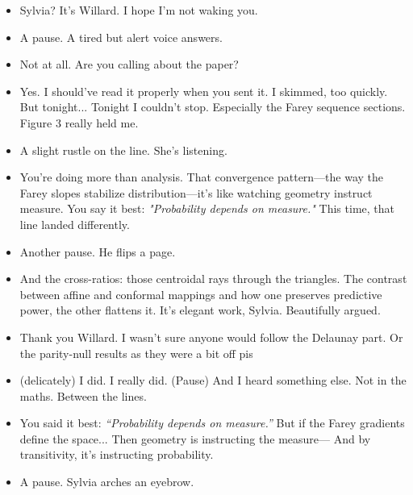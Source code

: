 \begin{itemize}[leftmargin=2cm, label={}]

\item[\textbf{Willard:}]  
Sylvia? It's Willard. I hope I’m not waking you.

\item[] A pause. A tired but alert voice answers.

\item[\textbf{Sylvia:}]  
Not at all. Are you calling about the paper?

\item[\textbf{Willard:}]  
Yes.  
I should’ve read it properly when you sent it. I skimmed, too quickly. But tonight...  
Tonight I couldn’t stop. Especially the Farey sequence sections. Figure 3 really held me.

\item[] A slight rustle on the line. She’s listening.

\item[\textbf{Willard:}]  
You’re doing more than analysis. That convergence pattern—the way the Farey slopes stabilize distribution—it’s like watching geometry instruct measure.  
You say it best: \textit{"Probability depends on measure."}  
This time, that line landed differently.

\item[] Another pause. He flips a page.

\item[\textbf{Willard:}]  
And the cross-ratios: those centroidal rays through the triangles.  
The contrast between affine and conformal mappings and how one preserves predictive power, the other flattens it. It’s elegant work, Sylvia. Beautifully argued.

\item[\textbf{Sylvia:}]  
Thank you Willard.  
I wasn’t sure anyone would follow the Delaunay part. Or the parity-null results as they were a bit off pis

\item[\textbf{Willard :}] (delicately)
I did. I really did.  
(Pause)  
And I heard something else.  
Not in the maths.  
Between the lines.

\item[\textbf{Willard:}]  
You said it best: \textit{“Probability depends on measure.”}  
But if the Farey gradients define the space...  
Then geometry is instructing the measure—  
And by transitivity, it’s instructing probability.  

\item[] A pause. Sylvia arches an eyebrow.


\end{itemize}
